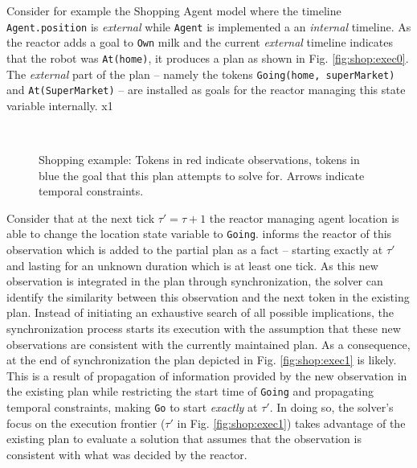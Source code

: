 Consider for example the Shopping Agent model where the timeline 
\texttt{Agent.position} is {\em external} while \texttt{Agent} is
implemented a an {\em internal} timeline. As the reactor adds a goal to
\texttt{Own} milk and the current {\em external} timeline indicates
that the robot was \texttt{At(home)}, it produces a plan as shown in
Fig. \ref{fig:shop:exec0}. The {\em external} part of the plan --
namely the tokens \texttt{Going(home, superMarket)} and
\texttt{At(SuperMarket)} -- are installed as goals for the reactor
managing this state variable internally.
x1
\begin{figure}[!htb]
  \centering
   \\
    \caption{\small Shopping example: Tokens in red indicate
      observations, tokens in blue the goal that this plan attempts to
      solve for. Arrows indicate temporal constraints. }
  \label{fig:shop:exec}
\end{figure}

Consider that at the next tick $\tau' = \tau+1$ the reactor managing
agent location is able to change the location state variable to
\texttt{Going}. \rx informs the reactor of this observation which is
added to the partial plan as a fact -- starting exactly at $\tau'$ and
lasting for an unknown duration which is at least one tick. As this
new observation is integrated in the plan through synchronization, the
solver can identify the similarity between this observation and the
next token in the existing plan. Instead of initiating an exhaustive
search of all possible implications, the synchronization process
starts its execution with the assumption that these new observations
are consistent with the currently maintained plan. As a consequence,
at the end of synchronization the plan depicted in Fig.
\ref{fig:shop:exec1} is likely. This is a result of propagation of
information provided by the new observation in the existing plan while
restricting the start time of \texttt{Going} and propagating temporal
constraints, making \texttt{Go} to start {\em exactly} at $\tau'$. In
doing so, the \eu solver's focus on the execution frontier ($\tau'$ in
Fig. \ref{fig:shop:exec1}) takes advantage of the existing plan to
evaluate a solution that assumes that the observation is consistent
with what was decided by the reactor.

